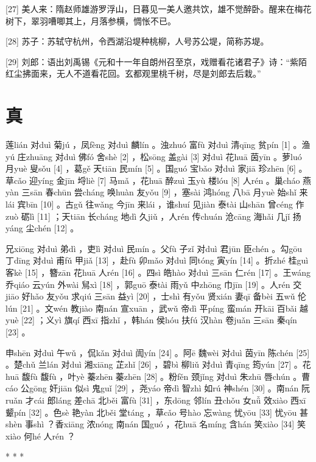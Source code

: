 \documentclass[12pt,UTF8]{ctexbook}
\begin{document}
[27] 美人来：隋赵师雄游罗浮山，日暮见一美人邀共饮，雄不觉醉卧。醒来在梅花树下，翠羽嘈唧其上，月落参横，惆怅不已。

[28] 苏子：苏轼守杭州，令西湖沿堤种桃柳，人号苏公堤，简称苏堤。

[29] 刘郎：语出刘禹锡《元和十一年自朗州召至京，戏赠看花诸君子》诗：“紫陌红尘拂面来，无人不道看花回。玄都观里桃千树，尽是刘郎去后栽。”





\chapter{真}


莲lián 对duì 菊jú ，凤fèng 对duì 麟lín 。浊zhuó 富fù 对duì 清qīng 贫pín [1] 。渔yú 庄zhuāng 对duì 佛fó 舍shè [2] ，松sōng 盖gài [3] 对duì 花huā 茵yīn 。萝luó 月yuè 叟sǒu [4] ，葛gě 天tiān 民mín [5] 。国guó 宝bǎo 对duì 家jiā 珍zhēn [6] 。草cǎo 迎yíng 金jīn 埒liè [7] 马mǎ ，花huā 醉zuì 玉yù 楼lóu [8] 人rén 。巢cháo 燕yàn 三sān 春chūn 尝cháng 唤huàn 友yǒu [9] ，塞sài 鸿hóng 八bā 月yuè 始shǐ 来lái 宾bīn [10] 。古gǔ 往wǎng 今jīn 来lái ，谁shuí 见jiàn 泰tài 山shān 曾céng 作zuò 砺lì [11] ；天tiān 长cháng 地dì 久jiǔ ，人rén 传chuán 沧cāng 海hǎi 几jǐ 扬yáng 尘chén [12] 。

兄xiōng 对duì 弟dì ，吏lì 对duì 民mín 。父fù 子zǐ 对duì 君jūn 臣chén 。勾gōu 丁dīng 对duì 甫fǔ 甲jiǎ [13] ，赴fù 卯mǎo 对duì 同tóng 寅yín [14] 。折zhé 桂guì 客kè [15] ，簪zān 花huā 人rén [16] 。四sì 皓hào 对duì 三sān 仁rén [17] 。王wáng 乔qiáo 云yún 外wài 舃xì [18] ，郭guō 泰tài 雨yǔ 中zhōng 巾jīn [19] 。人rén 交jiāo 好hǎo 友yǒu 求qiú 三sān 益yì [20] ，士shì 有yǒu 贤xián 妻qī 备bèi 五wǔ 伦lún [21] 。文wén 教jiào 南nán 宣xuān ，武wǔ 帝dì 平píng 蛮mán 开kāi 百bǎi 越yuè [22] ；义yì 旗qí 西xī 指zhǐ ，韩hán 侯hóu 扶fú 汉hàn 卷juǎn 三sān 秦qín [23] 。

申shēn 对duì 午wǔ ，侃kǎn 对duì 訚yín [24] 。阿ē 魏wèi 对duì 茵yīn 陈chén [25] 。楚chǔ 兰lán 对duì 湘xiāng 芷zhǐ [26] ，碧bì 柳liǔ 对duì 青qīng 筠yún [27] 。花huā 馥fù 馥fù ，叶yè 蓁zhēn 蓁zhēn [28] 。粉fěn 颈jǐng 对duì 朱zhū 唇chún 。曹cáo 公gōng 奸jiān 似sì 鬼guǐ [29] ，尧yáo 帝dì 智zhì 如rú 神shén [30] 。南nán 阮ruǎn 才cái 郎láng 差chā 北běi 富fù [31] ，东dōng 邻lín 丑chǒu 女nǚ 效xiào 西xī 颦pín [32] 。色sè 艳yàn 北běi 堂táng ，草cǎo 号hào 忘wàng 忧yōu [33] 忧yōu 甚shèn 事shì ？香xiāng 浓nóng 南nán 国guó ，花huā 名míng 含hán 笑xiào [34] 笑xiào 何hé 人rén ？



* * *
\end{document}
